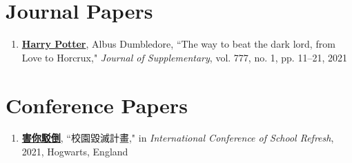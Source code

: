 \begin{publications}%


\section*{Journal Papers}
\begin{spacing}{1}
\begin{enumerate}

\item {\bf \underline{Harry Potter}}, Albus Dumbledore, ``The way to beat the dark lord, from Love to Horcrux," \textit{Journal of Supplementary}, vol. 777, no. 1, pp. 11--21, 2021

\end{enumerate}
\end{spacing}


\section*{Conference Papers}
\begin{spacing}{1}
\begin{enumerate}

\item {\bf \underline{害你駁倒}}, ``校園毀滅計畫," in \textit{International Conference of School Refresh}, 2021, Hogwarts, England

\end{enumerate}
\end{spacing}


\end{publications}